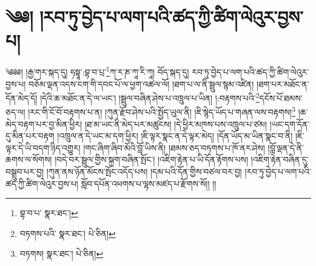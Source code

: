 \setcounter{footnote}{0} 
\chapter{༄༅། །རབ་ཏུ་བྱེད་པ་ལག་པའི་ཚད་ཀྱི་ཚིག་ལེའུར་བྱས་པ།}༄༅༅། །རྒྱ་གར་སྐད་དུ། ཧསྟཱ་:བྷ་བ་པྲ་\footnote{བྷ་བ་པ་  སྣར་ཐང་། }ཀ་ར་ཎ་ཀཱ་རི་ཀཱ། བོད་སྐད་དུ། རབ་ཏུ་བྱེད་པ་ལག་པའི་ཚད་ཀྱི་ཚིག་ལེའུར་བྱས་པ། བཅོམ་ལྡན་འདས་ངག་གི་དབང་པོ་ལ་ཕྱག་འཚལ་ལོ། །ཐག་པ་ལ་ནི་སྦྲུལ་སྙམ་འཛིན། །ཐག་པར་མཐོང་ན་དོན་མེད་དོ། །དེའི་ཆ་མཐོང་ན་དེ་ལ་ཡང་། །སྦྲུལ་བཞིན་ཤེས་པ་འཁྲུལ་པ་ཡིན། །:བརྟགས་པའི་\footnote{བཏགས་པའི་  སྣར་ཐང་།  པེ་ཅིན། }དངོས་པོ་ཐམས་ཅད་ལ། །རང་གི་ངོ་བོ་བརྟགས་པ་ན། །ཀུན་རྫོབ་ཤེས་པའི་སྤྱོད་ཡུལ་ནི། །ཇི་སྙེད་ཡོད་པ་གཞན་ལས་བརྟགས།\footnote{བཏགས།  སྣར་ཐང་།  པེ་ཅིན། } །ཆ་མེད་བརྟག་པར་བྱ་མིན་ཕྱིར། །ཐ་མ་ཡང་ནི་མེད་པར་མཚུངས། །དེ་ཕྱིར་མཁས་པས་འཁྲུལ་པ་ཙམ། །ཡང་དག་དོན་དུ་མིན་པར་བརྟག །འཁྲུལ་ན་དེ་ཡང་མ་དག་ཕྱིར། །ཇི་ལྟར་སྣང་ན་དེ་ལྟར་མེད། །དོན་ཡོད་མ་ཡིན་སྣང་བ་ནི། །ཇི་ལྟར་དེ་ཡི་བདག་ཉིད་འགྱུར། །གང་ཞིག་ཞིབ་མོའི་བློ་ཡིས་ནི། །ཐམས་ཅད་བཏགས་པ་ཁོ་ནར་ཤེས། །བློ་ལྡན་དེ་ནི་ཆགས་ལ་སོགས། །བདེ་བར་སྦྲུལ་གྱིས་སྐྲག་བཞིན་སྤོང་། །འཇིག་རྟེན་པ་ཡི་དོན་རྟོགས་པས། །འཇིག་རྟེན་བཞིན་དུ་བསྒྲུབ་པར་བྱ། །ཀུན་ནས་ཉོན་མོངས་སྤོང་འདོད་པས། །དམ་པའི་དོན་གྱིས་བཙལ་བར་བྱ། །རབ་ཏུ་བྱེད་པ་ལག་པའི་ཚད་ཀྱི་ཚིག་ལེའུར་བྱས་པ། སློབ་དཔོན་འཕགས་པ་ལྷས་མཛད་པ་རྫོགས་སོ།། །།